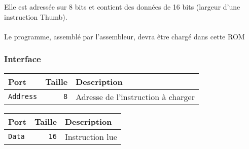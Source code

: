 Elle est adressée sur 8 bits et contient des données de 16 bits (largeur d'une instruction Thumb).

\paragraph{}
Le programme, assemblé par l'assembleur, devra être chargé dans cette ROM

\subsubsection{Interface}


\begin{tabular}{|l|r|l|}
\hline
\textbf{Port}		& \textbf{Taille} & \textbf{Description}\\
\hline

\texttt{Address}	& \texttt{8} & Adresse de l'instruction à charger\\

\hline
\end{tabular}


\begin{tabular}{|l|r|l|}
\hline 
\textbf{Port} & \textbf{Taille} & \textbf{Description}\\
\hline 

\texttt{Data}		& \texttt{16} & Instruction lue\\

\hline
\end{tabular}




